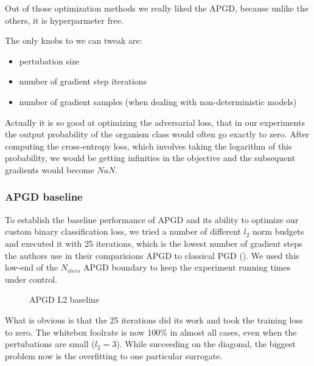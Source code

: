 Out of those optimization methods we really liked the APGD, because unlike the others, it is hyperparmeter free.

The only knobs to we can tweak are:

\begin{itemize}
    \item pertubation size
    \item number of gradient step iterations
    \item number of gradient samples (when dealing with non-deterministic models)
\end{itemize}

Actually it is so good at optimizing the adversarial loss, that in our experiments the output probability of the organism class would often go exactly to zero. After computing the cross-entropy loss, which involves taking the logarithm of this probability, we would be getting infinities in the objective and the subsequent gradients would become $NaN$.

\subsubsection{APGD baseline}
To establish the baseline performance of APGD and its ability to optimize our custom binary classification loss, we tried a number of different $l_2$ norm budgets and executed it with 25 iterations, which is the lowest number of gradient steps the authors use in their comparisions APGD to classical PGD (\cite{croce2020reliable}). We used this low-end of the $N_{iters}$ APGD boundary to keep the experiment running times under control.

\begin{figure}[!htb]
\centering
\caption{APGD L2 baseline}
\label{fig:apgd_baseline}
\end{figure}



What is obvious is that the 25 iterations did its work and took the training loss to zero. The whitebox foolrate is now 100\% in almost all cases, even when the pertubations are small ($l_2 = 3$). While succeeding on the diagonal, the biggest problem now is the overfitting to one particular surrogate.


